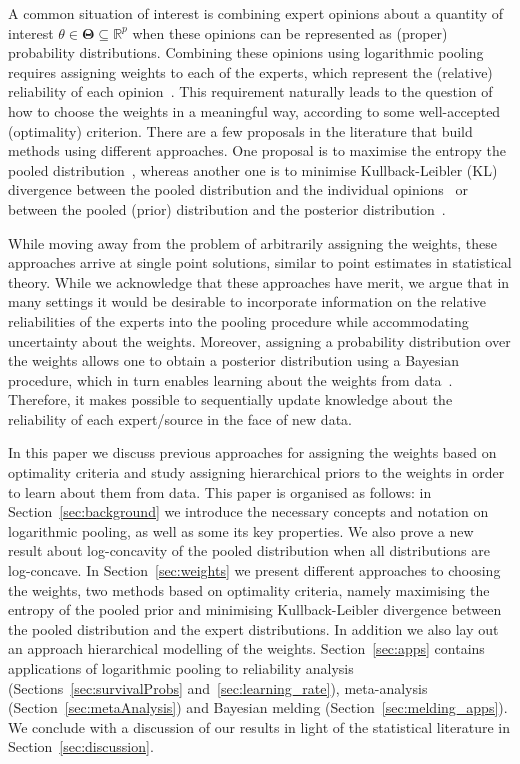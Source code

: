 \documentclass[a4paper, notitlepage, 11pt]{article}
\begin{document}
A common situation of interest is combining expert opinions about a quantity of interest $\theta \in \mathbf{\Theta} \subseteq \mathbb{R}^p$ when these opinions can be represented as (proper) probability distributions.
Combining these opinions using logarithmic pooling requires assigning weights to each of the experts, which represent the (relative) reliability of each opinion~\citep{Genest1984,French1985}.
This requirement naturally leads to the question of how to choose the weights in a meaningful way, according to some well-accepted (optimality) criterion.
There are a few proposals in the literature that build methods using different approaches.
One proposal is to maximise the entropy the pooled distribution~\citep{Myung1996}, whereas another one is to minimise Kullback-Leibler (KL) divergence between the pooled distribution and the individual opinions~\citep{Abbas2009} or between the pooled (prior) distribution and the posterior distribution~\citep{Rufo2012A,Rufo2012B}.

While moving away from the problem of arbitrarily assigning the weights, these approaches arrive at single point solutions, similar to point estimates in statistical theory.
While we acknowledge that these approaches have merit, we argue that in many settings it would be desirable to incorporate  information on the relative reliabilities of the experts into the pooling procedure while accommodating uncertainty about the weights.
Moreover, assigning a probability distribution over the weights allows one to obtain a posterior distribution using a Bayesian procedure, which in turn enables learning about the weights from data~\citep{Poole2000}.
Therefore, it makes possible to sequentially update knowledge about the reliability of each expert/source in the face of new data.

In this paper we discuss previous approaches for assigning the weights based on optimality criteria and study assigning hierarchical priors to the weights in order to learn about them from data.
This paper is organised as follows: in Section~\ref{sec:background} we introduce the necessary concepts and notation on logarithmic pooling, as well as some its key properties.
We also prove a new result about log-concavity of the pooled distribution when all distributions are log-concave.
In Section~\ref{sec:weights} we present different approaches to choosing the weights, two methods based on optimality criteria, namely maximising the entropy of the pooled prior and minimising Kullback-Leibler divergence between the pooled distribution and the expert distributions.
In addition we also lay out an approach hierarchical modelling of the weights.
Section~\ref{sec:apps} contains applications of logarithmic pooling to reliability analysis (Sections~\ref{sec:survivalProbs} and~\ref{sec:learning_rate}), meta-analysis (Section~\ref{sec:metaAnalysis}) and Bayesian melding (Section~\ref{sec:melding_apps}).
We conclude with a discussion of our results in light of the statistical literature in Section~\ref{sec:discussion}.
\end{document}
